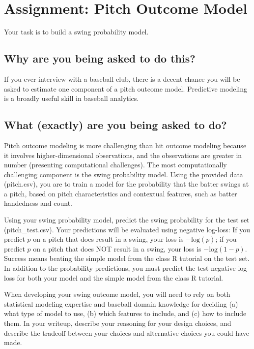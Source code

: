 \documentclass{article}
\begin{document}
  \section*{\sc Assignment: Pitch Outcome Model}

    Your task is to build a swing probability model.

    \subsection*{\sc Why are you being asked to do this?}

      If you ever interview with a baseball club, there is a decent chance you will be asked to estimate one component of a pitch outcome model. Predictive modeling is a broadly useful skill in baseball analytics.

    \subsection*{\sc What (exactly) are you being asked to do?}

      Pitch outcome modeling is more challenging than hit outcome modeling because it involves higher-dimensional observations, and the observations are greater in number (presenting computational challenges). The most computationally challenging component is the swing probability model. Using the provided data (pitch.csv), you are to train a model for the probability that the batter swings at a pitch, based on pitch characteristics and contextual features, such as batter handedness and count.
      
      Using your swing probability model, predict the swing probability for the test set (pitch\_test.csv). Your predictions will be evaluated using negative log-loss: If you predict $p$ on a pitch that does result in a swing, your loss is $-\mbox{log}(p)$; if you predict $p$ on a pitch that does NOT result in a swing, your loss is $-\mbox{log}(1 - p)$. Success means beating the simple model from the class R tutorial on the test set. In addition to the probability predictions, you must predict the test negative log-loss for both your model and the simple model from the class R tutorial.

      When developing your swing outcome model, you will need to rely on both statistical modeling expertise and baseball domain knowledge for deciding (a) what type of model to use, (b) which features to include, and (c) how to include them. In your writeup, describe your reasoning for your design choices, and describe the tradeoff between your choices and alternative choices you could have made.
\end{document}
